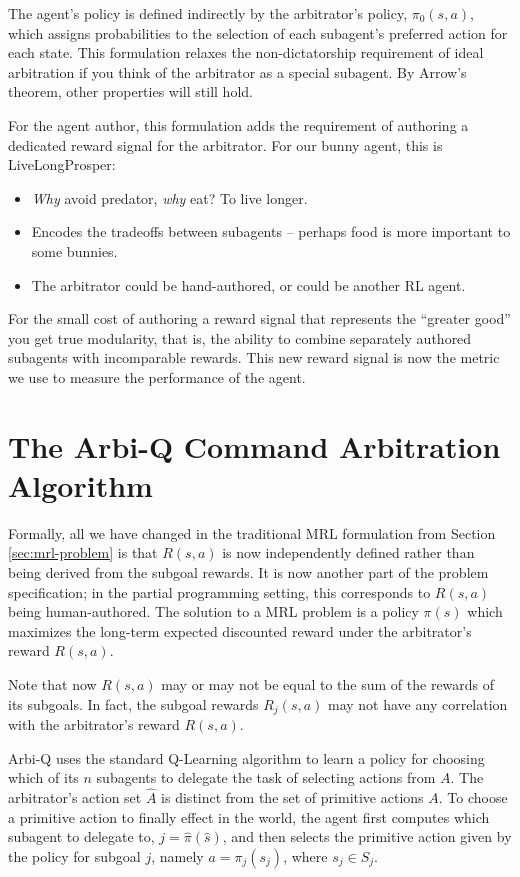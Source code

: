 The agent's policy is defined indirectly by the arbitrator's policy, $\pi_0(s, a)$, which assigns probabilities to the selection of each subagent's preferred action for each state.  This formulation relaxes the non-dictatorship requirement of ideal arbitration if you think of the arbitrator as a special subagent.  By Arrow's theorem, other properties will still hold.

For the agent author, this formulation adds the requirement of authoring a dedicated reward signal for the arbitrator.  For our bunny agent, this is LiveLongProsper:

\begin{itemize}
\item {\em Why} avoid predator, {\em why} eat? To live longer. 
\item Encodes the tradeoffs between subagents -- perhaps food is more
  important to some bunnies.
\item The arbitrator could be hand-authored, or could be another RL
  agent.
\end{itemize}

For the small cost of authoring a reward signal that represents the ``greater good'' you get true modularity, that is, the ability to combine separately authored subagents with incomparable rewards.  This new reward signal is now the metric we use to measure the performance of the agent.

\section{The Arbi-Q Command Arbitration Algorithm}\label{sec:mrl-arbiq}

Formally, all we have changed in the traditional MRL formulation from Section \ref{sec:mrl-problem} is that $R(s,a)$ is now independently defined rather than being derived from the subgoal rewards.  It is now another part of the problem specification; in the partial programming setting, this corresponds to $R(s,a)$ being human-authored.  The solution to a MRL problem is a policy $\pi(s)$ which maximizes the long-term expected discounted reward under the arbitrator's reward $R(s,a)$.

Note that now $R(s,a)$ may or may not be equal to the sum of the rewards of its subgoals.  In fact, the subgoal rewards $R_j(s,a)$ may not have any correlation with the arbitrator's reward $R(s,a)$.

Arbi-Q uses the standard Q-Learning algorithm to learn a policy for choosing which of its $n$ subagents to delegate the task of selecting actions from $A$.  The arbitrator's action set $\widehat{A}$ is distinct from the set of primitive actions $A$.  To choose a primitive action to finally effect in the world, the agent first computes which subagent to delegate to, $j=\widehat{\pi}(\widehat{s})$, and then selects the primitive action given by the policy for subgoal $j$, namely $a=\pi_j(s_j)$, where $s_j \in S_j$.

